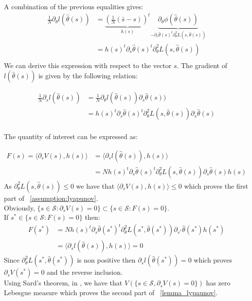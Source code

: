 \documentclass[a4paper]{article}
\theoremstyle{plain}
\theoremstyle{plain}
\theoremstyle{definition}
\begin{document}
\begin{appendices}
A combination of the previous equalities gives:
\begin{equation}
\begin{split}
\frac{1}{N}\partial_{\theta} l(\hat{\theta}(s)) & = \underbrace{(\frac{1}{N}(\bar{s}-s))^t}_{h(s)}\underbrace{\partial_{\theta}\phi(\hat{\theta}(s))}_{-\partial_{s}\hat{\theta}(s)^t\partial^2_{\theta} L(s,\hat{\theta}(s))}\\
& = h(s)^t\partial_{s}\hat{\theta}(s)^t\partial^2_{\theta} L(s,\hat{\theta}(s))\\
\end{split}
\end{equation}
We can derive this expression with respect to the vector $s$. The gradient of $l(\hat{\theta}(s))$ is given by the following relation:

\begin{equation}
\begin{split}
\frac{1}{N}\partial_{s} l(\hat{\theta}(s)) & = \frac{1}{N}\partial_{\theta}l(\hat{\theta}(s))\partial_{s}\hat{\theta}(s))\\
& = h(s)^t \partial_{s}\hat{\theta}(s)^t\partial^2_{\theta} L(s,\hat{\theta}(s))\partial_{s}\hat{\theta}(s)\\
\end{split}
\end{equation}



The quantity of interest can be expressed as:

\begin{equation}
\begin{split}
F(s) = \langle \partial_{s}V(s), h(s) \rangle & = \langle \partial_{s} l(\hat{\theta}(s)), h(s) \rangle\\
& =  N h(s)^t \partial_{s}\hat{\theta}(s)^t\partial^2_{\theta} L(s,\hat{\theta}(s))\partial_{s}\hat{\theta}(s)h(s)
\end{split}
\end{equation}
As $\partial^2_{\theta} L(s,\hat{\theta}(s)) \leq 0$ we have that $\langle \partial_{s}V(s), h(s) \rangle \leq 0$ which proves the first part of ~\ref{assumption:lyapunov}.\\
Obviously, $\{s \in \mathcal{S}: \partial_{s}V(s) = 0\} \subset \{s \in \mathcal{S}: F(s) = 0\}$.\\ If $s^* \in \{s \in \mathcal{S}: F(s) = 0\}$ then:
\begin{equation}
\begin{split}
F(s^*) & = N h(s)^t \partial_{s}\hat{\theta}(s^*)^t\partial^2_{\theta} L(s^*,\hat{\theta}(s^*))\partial_{s^*}\hat{\theta}(s^*)h(s^*)\\
& = \langle \partial_{s} l(\hat{\theta}(s)), h(s) \rangle = 0
\end{split}
\end{equation}
Since $\partial^2_{\theta} L(s^*,\hat{\theta}(s^*))$ is non positive then $\partial_{s} l(\hat{\theta}(s^*)) = 0$ which proves $\partial_{s}V(s^*) = 0$ and the reverse inclusion.\\
Using Sard's theorem, in \cite{brocker}, we have that $V(\{s \in \mathcal{S}, \partial_s V(s) = 0 \})$ has zero Lebesgue measure which proves the second part of ~\ref{lemma_lypaunov}.


\end{appendices}
\end{document}
